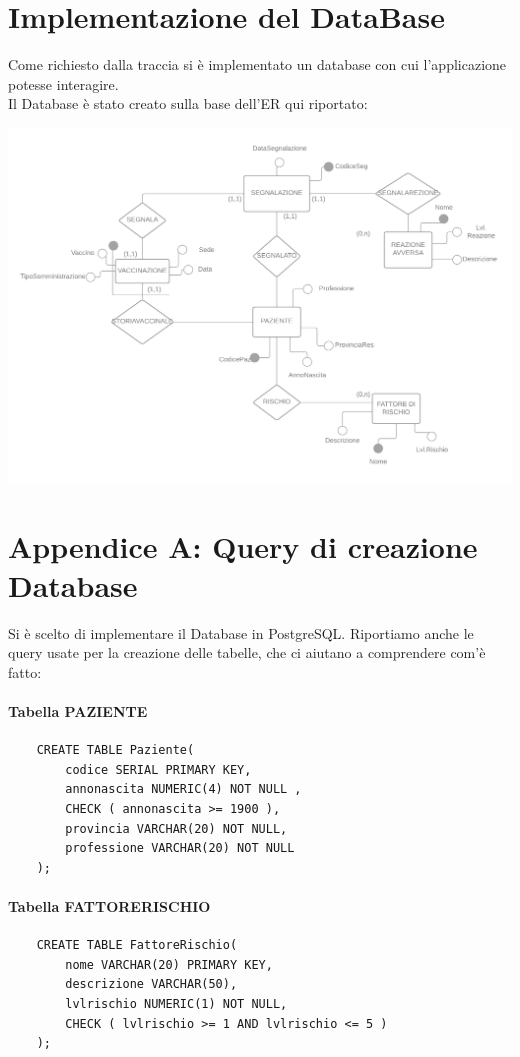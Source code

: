 \documentclass{article}
\begin{document}
\section{Implementazione del DataBase}
Come richiesto dalla traccia si è implementato un database con cui l'applicazione potesse interagire.\\
Il Database è stato creato sulla base dell'ER qui riportato:
\begin{center}
    \includegraphics[width=1\textwidth]{pictures/_Diagramma vuoto.png}
\end{center}

\newpage
\section*{Appendice A: Query di creazione Database}

Si è scelto di implementare il Database in PostgreSQL. Riportiamo anche le query usate per la creazione delle tabelle, che ci aiutano a comprendere com'è fatto:
\paragraph*{Tabella PAZIENTE}
\begin{verbatim}
    CREATE TABLE Paziente(
        codice SERIAL PRIMARY KEY,
        annonascita NUMERIC(4) NOT NULL ,
        CHECK ( annonascita >= 1900 ),
        provincia VARCHAR(20) NOT NULL,
        professione VARCHAR(20) NOT NULL
    );
\end{verbatim}
\paragraph*{Tabella FATTORERISCHIO}
\begin{verbatim}
    CREATE TABLE FattoreRischio(
        nome VARCHAR(20) PRIMARY KEY,
        descrizione VARCHAR(50),
        lvlrischio NUMERIC(1) NOT NULL,
        CHECK ( lvlrischio >= 1 AND lvlrischio <= 5 )
    );
\end{verbatim}
\end{document}
